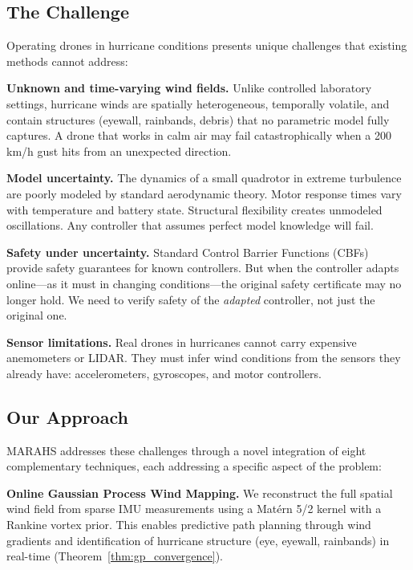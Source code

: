 \subsection{The Challenge}

Operating drones in hurricane conditions presents unique challenges that existing methods cannot address:

\textbf{Unknown and time-varying wind fields.} Unlike controlled laboratory settings, hurricane winds are spatially heterogeneous, temporally volatile, and contain structures (eyewall, rainbands, debris) that no parametric model fully captures. A drone that works in calm air may fail catastrophically when a 200 km/h gust hits from an unexpected direction.

\textbf{Model uncertainty.} The dynamics of a small quadrotor in extreme turbulence are poorly modeled by standard aerodynamic theory. Motor response times vary with temperature and battery state. Structural flexibility creates unmodeled oscillations. Any controller that assumes perfect model knowledge will fail.

\textbf{Safety under uncertainty.} Standard Control Barrier Functions (CBFs)~\cite{ames2014control} provide safety guarantees for known controllers. But when the controller adapts online---as it must in changing conditions---the original safety certificate may no longer hold. We need to verify safety of the \emph{adapted} controller, not just the original one.

\textbf{Sensor limitations.} Real drones in hurricanes cannot carry expensive anemometers or LIDAR. They must infer wind conditions from the sensors they already have: accelerometers, gyroscopes, and motor controllers.

\subsection{Our Approach}

MARAHS addresses these challenges through a novel integration of eight complementary techniques, each addressing a specific aspect of the problem:

\textbf{Online Gaussian Process Wind Mapping.} We reconstruct the full spatial wind field from sparse IMU measurements using a Matérn 5/2 kernel with a Rankine vortex prior. This enables predictive path planning through wind gradients and identification of hurricane structure (eye, eyewall, rainbands) in real-time (Theorem~\ref{thm:gp_convergence}).

